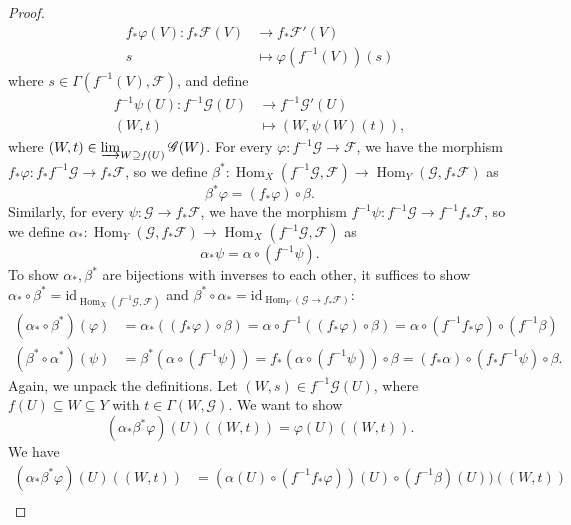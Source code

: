 \documentclass{article}
\newcommand{\fF}{\mathscr{F}}
\newcommand{\fG}{\mathscr{G}}
\DeclareMathOperator{\Hom}{Hom}
\begin{document}
\begin{enumerate} [label=\textbf{\arabic*.}, leftmargin=0em]
\begin{proof}
    \begin{align*}
       f_* \varphi(V) : f_* \fF(V) & \to  f_* \fF'(V)  \\
        s & \mapsto \varphi(f^{-1}(V))(s)
    \end{align*}
    where $s \in \Gamma(f^{-1}(V), \fF)$, and define
    \begin{align*}
        f^{-1} \psi(U) : f^{-1} \fG(U) & \to f^{-1} \fG'(U) \\
        (W, t) & \mapsto (W, \psi(W)(t)),
    \end{align*}
    where $(W, t) \in \varinjlim_{W \supseteq f(U)} \fG(W)$. For every $\varphi : f^{-1} \fG \to \fF$, we have the morphism $f_* \varphi : f_* f^{-1} \fG \to f_* \fF$, so we define $\beta^* : \Hom_X(f^{-1} \fG, \fF) \to \Hom_Y(\fG, f_* \fF)$ as
    \begin{equation*}
        \beta^* \varphi = (f_* \varphi) \circ \beta.
    \end{equation*}
    Similarly, for every $\psi : \fG \to f_* \fF$, we have the morphism $f^{-1} \psi : f^{-1} \fG \to f^{-1} f_* \fF$, so we define $\alpha_* : \Hom_Y(\fG, f_* \fF) \to \Hom_X(f^{-1} \fG, \fF)$ as
    \begin{equation*}
        \alpha_* \psi = \alpha \circ (f^{-1} \psi).
    \end{equation*}
    To show $\alpha_*, \beta^*$ are bijections with inverses to each other, it suffices to show $\alpha_* \circ \beta^* = \text{id}_{\Hom_X(f^{-1} \fG, \fF)}$ and $\beta^* \circ \alpha_* = \text{id}_{\Hom_Y(\fG \to f_* \fF)}$:
    \begin{align*}
        (\alpha_* \circ \beta^*)(\varphi) & = \alpha_*((f_* \varphi) \circ \beta) = \alpha \circ f^{-1}((f_* \varphi) \circ \beta) = \alpha \circ (f^{-1} f_* \varphi) \circ (f^{-1} \beta) \\
        (\beta^* \circ \alpha^*)(\psi) & = \beta^*(\alpha \circ (f^{-1} \psi)) = f_*(\alpha \circ (f^{-1}\psi)) \circ \beta = (f_* \alpha) \circ (f_*f^{-1} \psi) \circ \beta.
    \end{align*}
    Again, we unpack the definitions. Let $(W, s) \in f^{-1} \fG(U)$, where $f(U) \subseteq W \subseteq Y$ with $t \in \Gamma(W, \fG)$. We want to show
    \begin{equation*}
        (\alpha_*\beta^*\varphi)(U)((W, t)) = \varphi(U)((W, t)).
    \end{equation*}
    We have
    \begin{align*}
        (\alpha_*\beta^*\varphi)(U)((W, t)) & = (\alpha(U) \circ (f^{-1}f_* \varphi))(U) \circ (f^{-1} \beta)(U))((W, t)) \\

\end{align*}
\end{proof}
\end{enumerate}
\end{document}
